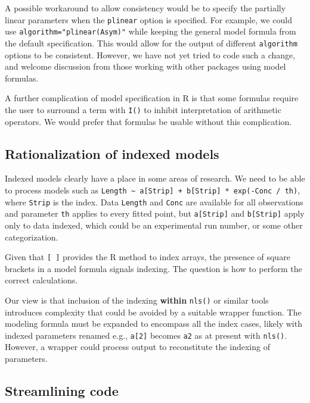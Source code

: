\documentclass[
]{article}
\begin{document}
A possible workaround to allow consistency would be to specify the
partially linear parameters when the \texttt{plinear} option is
specified. For example, we could use \texttt{algorithm="plinear(Asym)"}
while keeping the general model formula from the default specification.
This would allow for the output of different \texttt{algorithm} options
to be consistent. However, we have not yet tried to code such a change,
and welcome discussion from those working with other packages using
model formulas.

A further complication of model specification in R is that some formulas
require the user to surround a term with \texttt{I()} to inhibit
interpretation of arithmetic operators. We would prefer that formulas be
usable without this complication.

\hypertarget{rationalization-of-indexed-models}{%
\subsection{Rationalization of indexed
models}\label{rationalization-of-indexed-models}}

Indexed models clearly have a place in some areas of research. We need
to be able to process models such as
\texttt{Length\ \textasciitilde{}\ a{[}Strip{]}\ +\ b{[}Strip{]}\ *\ exp(-Conc\ /\ th)},
where \texttt{Strip} is the index. Data \texttt{Length} and
\texttt{Conc} are available for all observations and parameter
\texttt{th} applies to every fitted point, but \texttt{a{[}Strip{]}} and
\texttt{b{[}Strip{]}} apply only to data indexed, which could be an
experimental run number, or some other categorization.

Given that \texttt{{[}\ {]}} provides the R method to index arrays, the
presence of square brackets in a model formula signals indexing. The
question is how to perform the correct calculations.

Our view is that inclusion of the indexing \textbf{within}
\texttt{nls()} or similar tools introduces complexity that could be
avoided by a suitable wrapper function. The modeling formula must be
expanded to encompass all the index cases, likely with indexed
parameters renamed e.g., \texttt{a{[}2{]}} becomes \texttt{a2} as at
present with \texttt{nls()}. However, a wrapper could process output to
reconstitute the indexing of parameters.

\hypertarget{streamlining-code}{%
\subsection{Streamlining code}\label{streamlining-code}}
\end{document}
